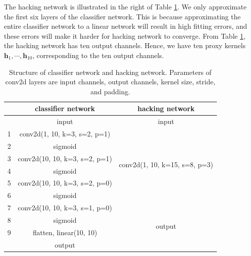 \documentclass[twoside,11pt]{article}
\def\tvar#1{\mathbf{#1}} %
\begin{document}
The hacking network is illustrated in the right of Table \ref{tab:structure-of-classifier-network}.
We only approximate the first six layers of the classifier network.
This is because approximating the entire classifier network to a linear network will result in high fitting errors, and these errors will make it harder for hacking network to converge. From Table \ref{tab:structure-of-classifier-network}, the hacking network has ten output channels. Hence, we have ten proxy kernels \(\tvar{h}_{1}, \cdots, \tvar{h}_{10}\), corresponding to the ten output channels.


\begin{table}[htb]
  \caption{Structure of classifier network and hacking network. Parameters of conv2d layers are input channels, output channels, kernel size, stride, and padding.}
  \label{tab:structure-of-classifier-network}
  \centering
  \begin{tabular}{c||c|c}
    \hline
              & classifier network            & hacking network                                \\ \hline
              & input                         & input                                          \\ \hline
    \small{1} & conv2d(1, 10, k=3, s=2, p=1)  & \multirow{6}{*}{conv2d(1, 10, k=15, s=8, p=3)} \\
    \cline{1-2}
    \small{2} & sigmoid                       &                                                \\
    \cline{1-2}
    \small{3} & conv2d(10, 10, k=3, s=2, p=1) &                                                \\
    \cline{1-2}
    \small{4} & sigmoid                       &                                                \\
    \cline{1-2}
    \small{5} & conv2d(10, 10, k=3, s=2, p=0) &                                                \\
    \cline{1-2}
    \small{6} & sigmoid                       &                                                \\
    \cline{1-3}
    \small{7} & conv2d(10, 10, k=3, s=1, p=0) & \multirow{4}{*}{output}                        \\
    \cline{1-2}
    \small{8} & sigmoid                       &                                                \\
    \cline{1-2}
    \small{9} & flatten, linear(10, 10)       &                                                \\
    \cline{1-2}
              & output                        &                                                \\ \hline
  \end{tabular}
\end{table}
\end{document}
